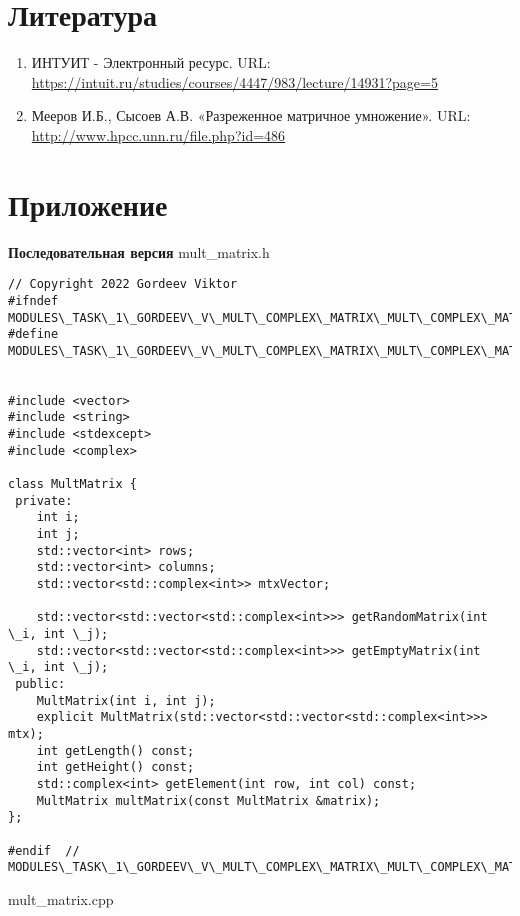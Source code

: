 \documentclass{report}
\begin{document}
\section*{Литература}
\begin{enumerate}
\item ИНТУИТ - Электронный ресурс. URL: \newline \url{https://intuit.ru/studies/courses/4447/983/lecture/14931?page=5}
\item Мееров И.Б., Сысоев А.В. «Разреженное матричное умножение». URL: \newline \url{http://www.hpcc.unn.ru/file.php?id=486}
\end{enumerate}
\newpage

\section*{Приложение}
\textbf{Последовательная версия}
\newline
\newline mult\_matrix.h
\begin{lstlisting}
// Copyright 2022 Gordeev Viktor
#ifndef MODULES\_TASK\_1\_GORDEEV\_V\_MULT\_COMPLEX\_MATRIX\_MULT\_COMPLEX\_MATRIX\_H\_
#define MODULES\_TASK\_1\_GORDEEV\_V\_MULT\_COMPLEX\_MATRIX\_MULT\_COMPLEX\_MATRIX\_H\_


#include <vector>
#include <string>
#include <stdexcept>
#include <complex>

class MultMatrix {
 private:
    int i;
    int j;
    std::vector<int> rows;
    std::vector<int> columns;
    std::vector<std::complex<int>> mtxVector;

    std::vector<std::vector<std::complex<int>>> getRandomMatrix(int \_i, int \_j);
    std::vector<std::vector<std::complex<int>>> getEmptyMatrix(int \_i, int \_j);
 public:
    MultMatrix(int i, int j);
    explicit MultMatrix(std::vector<std::vector<std::complex<int>>> mtx);
    int getLength() const;
    int getHeight() const;
    std::complex<int> getElement(int row, int col) const;
    MultMatrix multMatrix(const MultMatrix &matrix);
};

#endif  // MODULES\_TASK\_1\_GORDEEV\_V\_MULT\_COMPLEX\_MATRIX\_MULT\_COMPLEX\_MATRIX\_H\_

\end{lstlisting}
mult\_matrix.cpp
\end{document}
